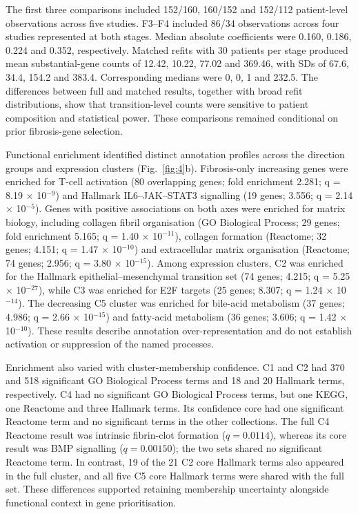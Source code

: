 \documentclass[11pt,a4paper]{article}
\begin{document}
The first three comparisons included 152/160, 160/152 and 152/112 patient-level observations across five studies. F3--F4 included 86/34 observations across four studies represented at both stages. Median absolute coefficients were 0.160, 0.186, 0.224 and 0.352, respectively. Matched refits with 30 patients per stage produced mean substantial-gene counts of 12.42, 10.22, 77.02 and 369.46, with SDs of 67.6, 34.4, 154.2 and 383.4. Corresponding medians were 0, 0, 1 and 232.5. The differences between full and matched results, together with broad refit distributions, show that transition-level counts were sensitive to patient composition and statistical power. These comparisons remained conditional on prior fibrosis-gene selection.

Functional enrichment identified distinct annotation profiles across the direction groups and expression clusters (Fig.~\ref{fig:4}b). Fibrosis-only increasing genes were enriched for T-cell activation (80 overlapping genes; fold enrichment 2.281; q = 8.19 \ensuremath{\times} 10\ensuremath{^{-9}}) and Hallmark IL6–JAK–STAT3 signalling (19 genes; 3.556; q = 2.14 \ensuremath{\times} 10\ensuremath{^{-5}}). Genes with positive associations on both axes were enriched for matrix biology, including collagen fibril organisation (GO Biological Process; 29 genes; fold enrichment 5.165; q = 1.40 \ensuremath{\times} 10\ensuremath{^{-11}}), collagen formation (Reactome; 32 genes; 4.151; q = 1.47 \ensuremath{\times} 10\ensuremath{^{-10}}) and extracellular matrix organisation (Reactome; 74 genes; 2.956; q = 3.80 \ensuremath{\times} 10\ensuremath{^{-15}}). Among expression clusters, C2 was enriched for the Hallmark epithelial–mesenchymal transition set (74 genes; 4.215; q = 5.25 \ensuremath{\times} 10\ensuremath{^{-27}}), while C3 was enriched for E2F targets (25 genes; 8.307; q = 1.24 \ensuremath{\times} 10\ensuremath{^{-14}}). The decreasing C5 cluster was enriched for bile-acid metabolism (37 genes; 4.986; q = 2.66 \ensuremath{\times} 10\ensuremath{^{-15}}) and fatty-acid metabolism (36 genes; 3.606; q = 1.42 \ensuremath{\times} 10\ensuremath{^{-10}}). These results describe annotation over-representation and do not establish activation or suppression of the named processes.

Enrichment also varied with cluster-membership confidence. C1 and C2 had 370 and 518 significant GO Biological Process terms and 18 and 20 Hallmark terms, respectively. C4 had no significant GO Biological Process terms, but one KEGG, one Reactome and three Hallmark terms. Its confidence core had one significant Reactome term and no significant terms in the other collections. The full C4 Reactome result was intrinsic fibrin-clot formation (\(q=0.0114\)), whereas its core result was BMP signalling (\(q=0.00150\)); the two sets shared no significant Reactome term. In contrast, 19 of the 21 C2 core Hallmark terms also appeared in the full cluster, and all five C5 core Hallmark terms were shared with the full set. These differences supported retaining membership uncertainty alongside functional context in gene prioritisation.
\end{document}
